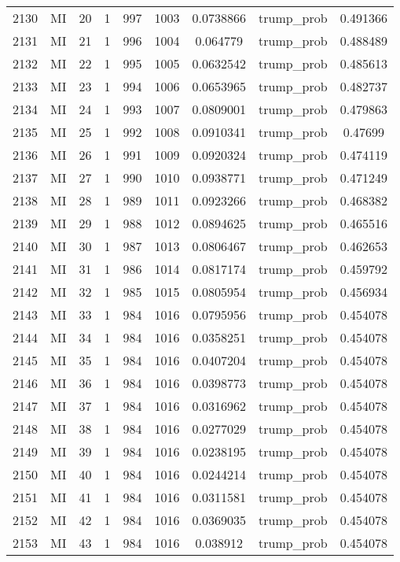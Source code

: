 \documentclass[12pt,a4paper]{article}
\begin{document}
\begin{tabular}{r|cccccccc}
	2130 & MI & 20 & 1 & 997 & 1003 & 0.0738866 & trump\_prob & 0.491366 \\
	2131 & MI & 21 & 1 & 996 & 1004 & 0.064779 & trump\_prob & 0.488489 \\
	2132 & MI & 22 & 1 & 995 & 1005 & 0.0632542 & trump\_prob & 0.485613 \\
	2133 & MI & 23 & 1 & 994 & 1006 & 0.0653965 & trump\_prob & 0.482737 \\
	2134 & MI & 24 & 1 & 993 & 1007 & 0.0809001 & trump\_prob & 0.479863 \\
	2135 & MI & 25 & 1 & 992 & 1008 & 0.0910341 & trump\_prob & 0.47699 \\
	2136 & MI & 26 & 1 & 991 & 1009 & 0.0920324 & trump\_prob & 0.474119 \\
	2137 & MI & 27 & 1 & 990 & 1010 & 0.0938771 & trump\_prob & 0.471249 \\
	2138 & MI & 28 & 1 & 989 & 1011 & 0.0923266 & trump\_prob & 0.468382 \\
	2139 & MI & 29 & 1 & 988 & 1012 & 0.0894625 & trump\_prob & 0.465516 \\
	2140 & MI & 30 & 1 & 987 & 1013 & 0.0806467 & trump\_prob & 0.462653 \\
	2141 & MI & 31 & 1 & 986 & 1014 & 0.0817174 & trump\_prob & 0.459792 \\
	2142 & MI & 32 & 1 & 985 & 1015 & 0.0805954 & trump\_prob & 0.456934 \\
	2143 & MI & 33 & 1 & 984 & 1016 & 0.0795956 & trump\_prob & 0.454078 \\
	2144 & MI & 34 & 1 & 984 & 1016 & 0.0358251 & trump\_prob & 0.454078 \\
	2145 & MI & 35 & 1 & 984 & 1016 & 0.0407204 & trump\_prob & 0.454078 \\
	2146 & MI & 36 & 1 & 984 & 1016 & 0.0398773 & trump\_prob & 0.454078 \\
	2147 & MI & 37 & 1 & 984 & 1016 & 0.0316962 & trump\_prob & 0.454078 \\
	2148 & MI & 38 & 1 & 984 & 1016 & 0.0277029 & trump\_prob & 0.454078 \\
	2149 & MI & 39 & 1 & 984 & 1016 & 0.0238195 & trump\_prob & 0.454078 \\
	2150 & MI & 40 & 1 & 984 & 1016 & 0.0244214 & trump\_prob & 0.454078 \\
	2151 & MI & 41 & 1 & 984 & 1016 & 0.0311581 & trump\_prob & 0.454078 \\
	2152 & MI & 42 & 1 & 984 & 1016 & 0.0369035 & trump\_prob & 0.454078 \\
	2153 & MI & 43 & 1 & 984 & 1016 & 0.038912 & trump\_prob & 0.454078 \\

\end{tabular}
\end{document}
